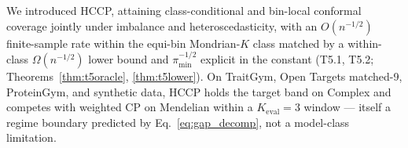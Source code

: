 
We introduced HCCP, attaining class-conditional and bin-local conformal coverage jointly under imbalance and heteroscedasticity, with an $O(n^{-1/2})$ finite-sample rate within the equi-bin Mondrian-$K$ class matched by a within-class $\Omega(n^{-1/2})$ lower bound and $\pi_{\min}^{-1/2}$ explicit in the constant (T5.1, T5.2; Theorems~\ref{thm:t5oracle}, \ref{thm:t5lower}). On TraitGym, Open Targets matched-9, ProteinGym, and synthetic data, HCCP holds the target band on Complex and competes with weighted CP on Mendelian within a $K_{\mathrm{eval}}=3$ window --- itself a regime boundary predicted by Eq.~\ref{eq:gap_decomp}, not a model-class limitation.
